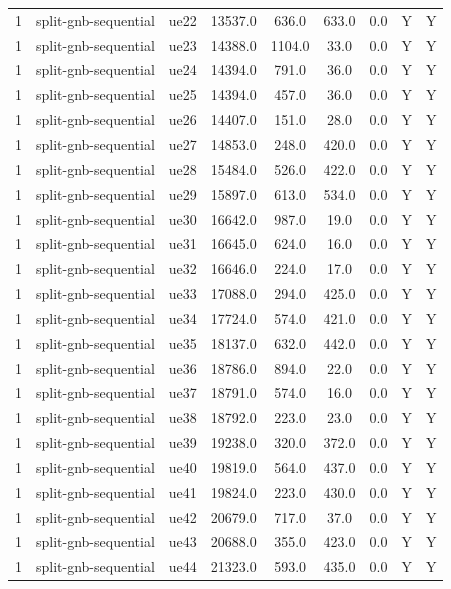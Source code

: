 \begin{table}[ht]
\begin{tabular}{|c|c|c|c|c|c|c|c|c|}
1 & split-gnb-sequential & ue22 & 13537.0 & 636.0 & 633.0 & 0.0 & Y & Y \\
1 & split-gnb-sequential & ue23 & 14388.0 & 1104.0 & 33.0 & 0.0 & Y & Y \\
1 & split-gnb-sequential & ue24 & 14394.0 & 791.0 & 36.0 & 0.0 & Y & Y \\
1 & split-gnb-sequential & ue25 & 14394.0 & 457.0 & 36.0 & 0.0 & Y & Y \\
1 & split-gnb-sequential & ue26 & 14407.0 & 151.0 & 28.0 & 0.0 & Y & Y \\
1 & split-gnb-sequential & ue27 & 14853.0 & 248.0 & 420.0 & 0.0 & Y & Y \\
1 & split-gnb-sequential & ue28 & 15484.0 & 526.0 & 422.0 & 0.0 & Y & Y \\
1 & split-gnb-sequential & ue29 & 15897.0 & 613.0 & 534.0 & 0.0 & Y & Y \\
1 & split-gnb-sequential & ue30 & 16642.0 & 987.0 & 19.0 & 0.0 & Y & Y \\
1 & split-gnb-sequential & ue31 & 16645.0 & 624.0 & 16.0 & 0.0 & Y & Y \\
1 & split-gnb-sequential & ue32 & 16646.0 & 224.0 & 17.0 & 0.0 & Y & Y \\
1 & split-gnb-sequential & ue33 & 17088.0 & 294.0 & 425.0 & 0.0 & Y & Y \\
1 & split-gnb-sequential & ue34 & 17724.0 & 574.0 & 421.0 & 0.0 & Y & Y \\
1 & split-gnb-sequential & ue35 & 18137.0 & 632.0 & 442.0 & 0.0 & Y & Y \\
1 & split-gnb-sequential & ue36 & 18786.0 & 894.0 & 22.0 & 0.0 & Y & Y \\
1 & split-gnb-sequential & ue37 & 18791.0 & 574.0 & 16.0 & 0.0 & Y & Y \\
1 & split-gnb-sequential & ue38 & 18792.0 & 223.0 & 23.0 & 0.0 & Y & Y \\
1 & split-gnb-sequential & ue39 & 19238.0 & 320.0 & 372.0 & 0.0 & Y & Y \\
1 & split-gnb-sequential & ue40 & 19819.0 & 564.0 & 437.0 & 0.0 & Y & Y \\
1 & split-gnb-sequential & ue41 & 19824.0 & 223.0 & 430.0 & 0.0 & Y & Y \\
1 & split-gnb-sequential & ue42 & 20679.0 & 717.0 & 37.0 & 0.0 & Y & Y \\
1 & split-gnb-sequential & ue43 & 20688.0 & 355.0 & 423.0 & 0.0 & Y & Y \\
1 & split-gnb-sequential & ue44 & 21323.0 & 593.0 & 435.0 & 0.0 & Y & Y \\

\end{tabular}
\end{table}
